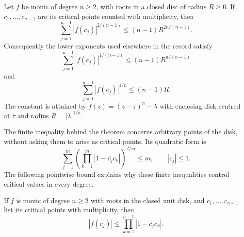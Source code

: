 \documentclass[11pt]{article}
\begin{document}
\begin{theorem}
\label{res:critical-value-budget}
Let $f$ be monic of degree $n\ge2$, with roots in a closed disc of radius
$R\ge0$.  If $c_1,\ldots,c_{n-1}$ are its critical points counted with
multiplicity, then
\begin{equation}\label{eq:critical-value-quadratic-budget}
 \sum_{j=1}^{n-1}|f(c_j)|^{2/(n-1)}
 \le(n-1)R^{2n/(n-1)}.
\end{equation}
Consequently the lower exponents used elsewhere in the record satisfy
\begin{equation}\label{eq:critical-value-power-budget}
 \sum_{j=1}^{n-1}|f(c_j)|^{1/(n-1)}
 \le(n-1)R^{n/(n-1)}
\end{equation}
and
\[
 \sum_{j=1}^{n-1}|f(c_j)|^{1/n}\le(n-1)R.
\]
The constant is attained by $f(z)=(z-\tau)^n-\lambda$ with enclosing
disk centred at $\tau$ and radius $R=|\lambda|^{1/n}$.
\end{theorem}

The finite inequality behind the theorem concerns arbitrary points of the
disk, without asking them to arise as critical points.  Its quadratic form is
\[
 \sum_{j=1}^m\left(\prod_{k=1}^m
       |1-\overline{c_j}c_k|\right)^{2/m}\le m,
 \qquad |c_j|\le1.
\]
The following pointwise bound explains why these finite inequalities
control critical values in every degree.

\begin{lemma}\label{res:reflected-critical-value}
If $f$ is monic of degree $n\ge2$ with roots in the closed unit disk,
and $c_1,\ldots,c_{n-1}$ list its critical points with multiplicity, then
\begin{equation}\label{eq:critical-reflected-product}
 |f(c_j)|\le\prod_{k=1}^{n-1}|1-\overline{c_j}c_k|.
\end{equation}
\end{lemma}
\end{document}
